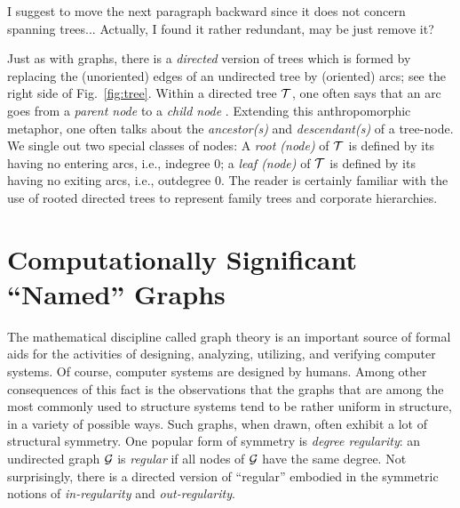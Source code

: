 {\Denis I suggest to move the next paragraph backward since it does not concern spanning trees...
Actually, I found it rather redundant, may be just remove it?}

Just as with graphs, there is a {\em directed} version of trees which
is formed by replacing the (unoriented) edges of an undirected tree by
(oriented) arcs; see the right side of Fig.~\ref{fig:tree}.  Within a directed tree
$\mbox{$\cal T$}$, one often says that an arc goes from a {\it parent node}
 to a {\it child node}
.  Extending this anthropomorphic metaphor, one often talks
about the {\it ancestor(s)}  and {\it
  descendant(s)}  of a tree-node.  We
single out two special classes of nodes: A {\it root (node)}
  of $\mbox{$\cal T$}$ is
defined by its having no entering arcs, i.e., indegree $0$; a {\it
  leaf (node)}  
 of $\mbox{$\cal T$}$ is defined by its having no
exiting arcs, i.e., outdegree $0$.  The reader is certainly familiar
with the use of rooted directed trees to represent family trees and
corporate hierarchies.


\section{Computationally Significant ``Named'' Graphs}
\label{sec:graphs-important-families}

The mathematical discipline called graph theory is an important source
of formal aids for the activities of designing, analyzing, utilizing,
and verifying computer systems.  Of course, computer systems are
designed by humans.  Among other consequences of this fact is the
observations that the graphs that are among the most commonly used to
structure systems tend to be rather uniform in structure, in a variety
of possible ways.  Such graphs, when drawn, often exhibit a lot of
structural symmetry.  One popular form of symmetry is {\it degree
  regularity}: an undirected graph $\mbox{$\cal G$}$ is {\it regular}
 if all nodes of $\mbox{$\cal G$}$ have the same degree.  Not
surprisingly, there is a directed version of ``regular'' embodied in the
symmetric notions of {\it in-regularity}
 and {\it out-regularity}.

\medskip

